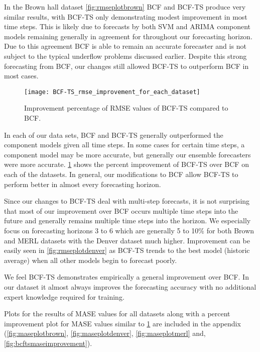 In the Brown hall dataset \ref{fig:rmseplotbrown} BCF and BCF-TS produce very similar results, with BCF-TS only demonstrating modest improvement in most time steps.  This is likely due to forecasts by both SVM and ARIMA component models remaining generally in agreement for throughout our forecasting horizon.  Due to this agreement BCF is able to remain an accurate forecaster and is not subject to the typical underflow problems discussed earlier.  Despite this strong forecasting from BCF, our changes still allowed BCF-TS to outperform BCF in most cases.

\begin{figure}[!h]
	\begin{center}
		\texttt{[image: BCF-TS\_rmse\_improvement\_for\_each\_dataset]}
	\end{center}
	\caption{Improvement percentage of RMSE values of BCF-TS compared to BCF.}
	\label{fig:bcftsrmseimprovement}
\end{figure}

In each of our data sets, BCF and BCF-TS generally outperformed the component models given all time steps.  In some cases for certain time steps, a component model may be more accurate, but generally our ensemble forecasters were more accurate.  \ref{fig:bcftsrmseimprovement} shows the percent improvement of BCF-TS over BCF on each of the datasets.  In general, our modifications to BCF allow BCF-TS to perform better in almost every forecasting horizon.  

Since our changes to BCF-TS deal with multi-step forecasts, it is not surprising that most of our improvement over BCF occurs multiple time steps into the future and generally remains multiple time steps into the horizon.  We especially focus on forecasting horizons 3 to 6 which are generally 5 to 10\% for both Brown and MERL datasets with the Denver dataset much higher.   Improvement can be easily seen in \ref{fig:rmseplotdenver} as BCF-TS trends to the best model (historic average) when all other models begin to forecast poorly.

We feel BCF-TS demonstrates empirically a general improvement over BCF.  In our dataset it almost always improves the forecasting accuracy with no additional expert knowledge required for training.

Plots for the results of MASE values for all datasets along with a percent improvement plot for MASE values similar to \ref{fig:bcftsrmseimprovement} are included in the appendix (\ref{fig:maseplotbrown}, \ref{fig:maseplotdenver}, \ref{fig:maseplotmerl} and, \ref{fig:bcftsmaseimprovement}).


